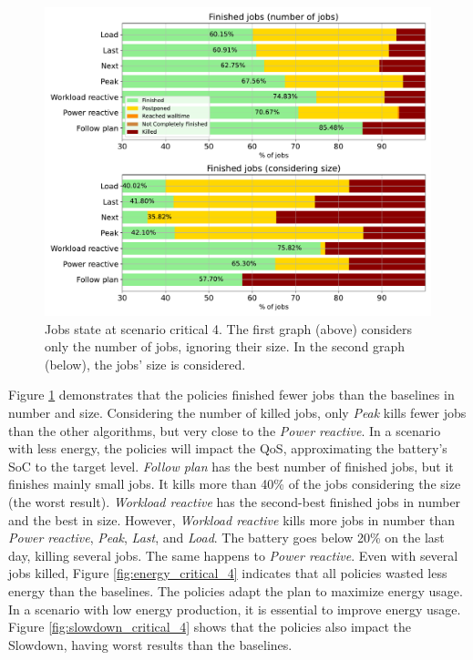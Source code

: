 \begin{figure}[!htb]
    \centering
    \includegraphics[scale=0.55]{Images/Compensations/jobs_critical_4.pdf}
    \caption{Jobs state at scenario critical 4. The first graph (above) considers only the number of jobs, ignoring their size. In the second graph (below), the jobs' size is considered.}
    \label{fig:jobs_critical_4}
\end{figure}

Figure \ref{fig:jobs_critical_4} demonstrates that the policies finished fewer jobs than the baselines in number and size. Considering the number of killed jobs, only \emph{Peak} kills fewer jobs than the other algorithms, but very close to the \emph{Power reactive}. In a scenario with less energy, the policies will impact the QoS, approximating the battery's SoC to the target level. \emph{Follow plan} has the best number of finished jobs, but it finishes mainly small jobs. It kills more than 40\% of the jobs considering the size (the worst result). \emph{Workload reactive} has the second-best finished jobs in number and the best in size. However, \emph{Workload reactive} kills more jobs in number than \emph{Power reactive}, \emph{Peak}, \emph{Last}, and \emph{Load}. The battery goes below 20\% on the last day, killing several jobs. The same happens to \emph{Power reactive}. Even with several jobs killed, Figure \ref{fig:energy_critical_4} indicates that all policies wasted less energy than the baselines. The policies adapt the plan to maximize energy usage. In a scenario with low energy production, it is essential to improve energy usage. Figure \ref{fig:slowdown_critical_4} shows that the policies also impact the Slowdown, having worst results than the baselines. 

